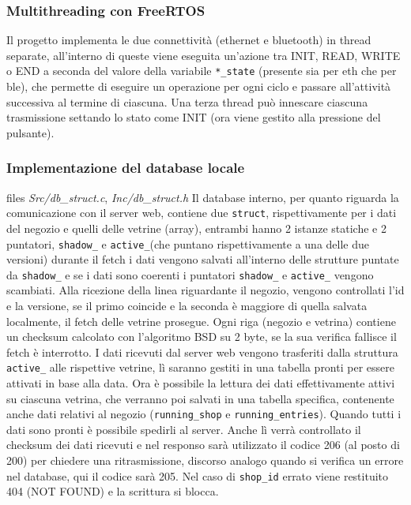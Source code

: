 \documentclass{article}
\begin{document}
\subsubsection{Multithreading con FreeRTOS}
Il progetto implementa le due connettivit\`{a} (ethernet e bluetooth) in thread separate, all'interno di queste viene eseguita un'azione tra INIT, READ, WRITE o END a seconda del valore della variabile \texttt{*\_state} (presente sia per eth che per ble), che permette di eseguire un operazione per ogni ciclo e passare all'attivit\`{a} successiva al termine di ciascuna. Una terza thread pu\`{o} innescare ciascuna trasmissione settando lo stato come INIT (ora viene gestito alla pressione del pulsante).

\subsubsection{Implementazione del database locale}
files \textit{Src/db\_struct.c}, \textit{Inc/db\_struct.h}
Il database interno, per quanto riguarda la comunicazione con il server web, contiene due \texttt{struct}, rispettivamente per i dati del negozio e quelli delle vetrine (array), entrambi hanno 2 istanze statiche e 2 puntatori, \texttt{shadow\_} e \texttt{active\_}(che puntano rispettivamente a una delle due versioni) durante il fetch i dati vengono salvati all'interno delle strutture puntate da \texttt{shadow\_} e se i dati sono coerenti i puntatori \texttt{shadow\_} e \texttt{active\_} vengono scambiati. Alla ricezione della linea riguardante il negozio, vengono controllati l'id e la versione, se il primo coincide e la seconda \`{e} maggiore di quella salvata localmente, il fetch delle vetrine prosegue. Ogni riga (negozio e vetrina) contiene un checksum calcolato con l'algoritmo BSD su 2 byte, se la sua verifica fallisce il fetch \`{e} interrotto.
I dati ricevuti dal server web vengono trasferiti dalla struttura \texttt{active\_} alle rispettive vetrine, l\`{i} saranno gestiti in una tabella pronti per essere attivati in base alla data. Ora \`{e} possibile la lettura dei dati effettivamente attivi su ciascuna vetrina, che verranno poi salvati in una tabella specifica, contenente anche dati relativi al negozio (\texttt{running\_shop} e \texttt{running\_entries}). Quando tutti i dati sono pronti \`{e} possibile spedirli al server. Anche l\`{i} verr\`{a} controllato il checksum dei dati ricevuti e nel responso sar\`{a} utilizzato il codice 206 (al posto di 200) per chiedere una ritrasmissione, discorso analogo quando si verifica un errore nel database, qui il codice sar\`{a} 205. Nel caso di \texttt{shop\_id} errato viene restituito 404 (NOT FOUND) e la scrittura si blocca.
\end{document}
